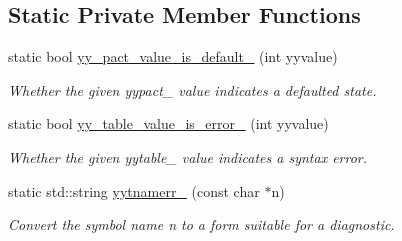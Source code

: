 \subsection*{Static Private Member Functions}
\begin{DoxyCompactItemize}
\item 
static bool \hyperlink{classyy_1_1_parser_implementation_a7b2d58f50fad60c4ca6d9494d120d88c}{yy\_\-pact\_\-value\_\-is\_\-default\_\-} (int yyvalue)
\begin{DoxyCompactList}\small\item\em Whether the given {\ttfamily yypact\_\-} value indicates a defaulted state. \end{DoxyCompactList}\item 
static bool \hyperlink{classyy_1_1_parser_implementation_aa44fe433139109916fa57e07e69bd890}{yy\_\-table\_\-value\_\-is\_\-error\_\-} (int yyvalue)
\begin{DoxyCompactList}\small\item\em Whether the given {\ttfamily yytable\_\-} value indicates a syntax error. \end{DoxyCompactList}\item 
static std::string \hyperlink{classyy_1_1_parser_implementation_abf7d9b4d9cd97c7822b2574e847e83c4}{yytnamerr\_\-} (const char $\ast$n)
\begin{DoxyCompactList}\small\item\em Convert the symbol name {\itshape n\/} to a form suitable for a diagnostic. \end{DoxyCompactList}\end{DoxyCompactItemize}
